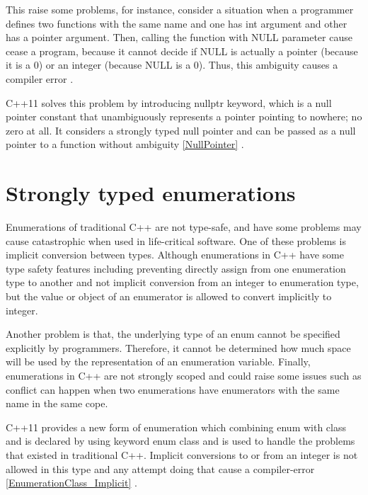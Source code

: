 \documentclass[11pt]{report}
\begin{document}
This raise some problems, for instance, consider a situation when a programmer defines two functions with the same name and one has int argument and other has a pointer argument. Then, calling the function with NULL parameter cause cease a program, because it cannot decide if NULL is actually a pointer (because it is a 0) or an integer (because NULL is a 0). Thus, this ambiguity causes a compiler error \cite{Cppreference:2012:Cpp11}.
\newline

C++11 solves this problem by introducing nullptr keyword, which is a null pointer constant that unambiguously represents a pointer pointing to nowhere; no zero at all. It considers a strongly typed null pointer and can be passed as a null pointer to a function without ambiguity \ref{NullPointer} \cite{Cppreference:2012:Cpp11}. 


\section{Strongly typed enumerations}
\label{section: Strongly typed enumerations}
Enumerations of traditional C++ are not type-safe, and have some problems may cause catastrophic when used in life-critical software. One of these problems is implicit conversion between types. Although enumerations in C++ have some type safety features including preventing directly assign from one enumeration type to another and not implicit conversion from an integer to enumeration type, but the value or object of an enumerator is allowed to convert implicitly to integer.
\newline

Another problem is that, the underlying type of an enum cannot be specified explicitly by programmers. Therefore, it cannot be determined how much space will be used by the representation of an enumeration variable. Finally, enumerations in C++ are not strongly scoped and could raise some issues such as conflict can happen when two enumerations have enumerators with the same name in the same cope\cite{Stroustrup:2012:Cpp11}.
\newline

C++11 provides a new form of enumeration which combining enum with class and is declared by using keyword enum class and is used to handle the problems that existed in traditional C++.  Implicit conversions to or from an integer is not allowed in this type and any attempt doing that cause a compiler-error \ref{EnumerationClass_Implicit} \cite{Overland:2011:CWF}.
\newline
\end{document}
